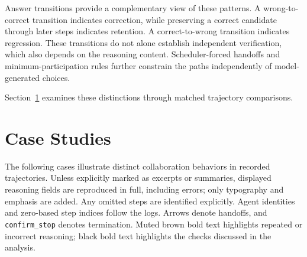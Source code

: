 Answer transitions provide a complementary view of these patterns. A wrong-to-correct transition indicates correction, while preserving a correct candidate through later steps indicates retention. A correct-to-wrong transition indicates regression. These transitions do not alone establish independent verification, which also depends on the reasoning content. Scheduler-forced handoffs and minimum-participation rules further constrain the paths independently of model-generated choices.

Section~\ref{app:case_studies} examines these distinctions through matched trajectory comparisons.

\FloatBarrier
\section{Case Studies}
\label{app:case_studies}
\raggedbottom

\newcommand{\caseTranscriptHeading}[1]{%
  \rowcolor{caseTranscriptHeader}%
  \textcolor{caseTranscriptInk}{\textbf{Step / action}} &
  \textcolor{caseTranscriptInk}{\textbf{#1}} \\
}
\newsavebox{\caseStudyBoxContent}
\newcommand{\caseStudyBox}[1]{%
  \par\addvspace{6pt}%
  \begingroup
  \sbox{\caseStudyBoxContent}{\fcolorbox{caseStudyBackground}{caseStudyBackground}{#1}}%
  \noindent\usebox{\caseStudyBoxContent}%
  \llap{\makebox[\wd\caseStudyBoxContent][l]{%
    \textcolor{caseStudyAccent}{%
      \rule[-\dp\caseStudyBoxContent]{2pt}{\dimexpr\ht\caseStudyBoxContent+\dp\caseStudyBoxContent\relax}}}}%
  \par\endgroup
  \addvspace{4pt}%
}

The following cases illustrate distinct collaboration behaviors in recorded trajectories. Unless explicitly marked as excerpts or summaries, displayed reasoning fields are reproduced in full, including errors; only typography and emphasis are added. Any omitted steps are identified explicitly. Agent identities and zero-based step indices follow the logs. Arrows denote handoffs, and \texttt{confirm\_stop} denotes termination. Muted brown bold text highlights repeated or incorrect reasoning; black bold text highlights the checks discussed in the analysis.

